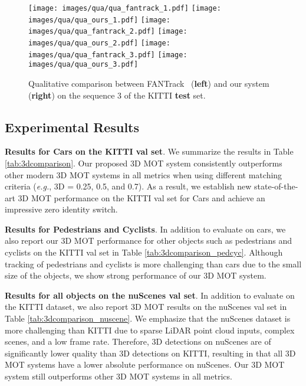 \documentclass[letterpaper, 10 pt, conference]{ieeeconf}
\begin{document}
\begin{figure*}[t]
\begin{center}
\texttt{[image: images/qua/qua\_fantrack\_1.pdf]}
\texttt{[image: images/qua/qua\_ours\_1.pdf]}
\texttt{[image: images/qua/qua\_fantrack\_2.pdf]}
\texttt{[image: images/qua/qua\_ours\_2.pdf]}
\texttt{[image: images/qua/qua\_fantrack\_3.pdf]}
\texttt{[image: images/qua/qua\_ours\_3.pdf]}
\end{center}
\vspace{-0.55cm}
\caption{Qualitative comparison between FANTrack~\cite{Baser2019} (\textbf{left}) and our system (\textbf{right}) on the sequence 3 of the KITTI \textbf{test} set.} 
\label{fig:qua}
\vspace{-0.5cm}
\end{figure*}

\subsection{Experimental Results}

\noindent\textbf{Results for Cars on the KITTI val set}. We summarize the results in Table \ref{tab:3dcomparison}. Our proposed 3D MOT system consistently outperforms other modern 3D MOT systems in all metrics when using different matching criteria (\emph{e.g.}, 3D  = 0.25, 0.5, and 0.7). As a result, we establish new state-of-the-art 3D MOT performance on the KITTI val set for Cars and achieve an impressive zero identity switch.

\vspace{1.5mm}\noindent\textbf{Results for Pedestrians and Cyclists}. In addition to evaluate on cars, we also report our 3D MOT performance for other objects such as pedestrians and cyclists on the KITTI val set in Table \ref{tab:3dcomparison_pedcyc}. Although tracking of pedestrians and cyclists is more challenging than cars due to the small size of the objects, we show strong performance of our 3D MOT system.

\vspace{1.5mm}\noindent\textbf{Results for all objects on the nuScenes val set}. In addition to evaluate on the KITTI dataset, we also report 3D MOT results on the nuScenes val set in Table \ref{tab:3dcomparison_nuscene}. We emphasize that the nuScenes dataset is more challenging than KITTI due to sparse LiDAR point cloud inputs, complex scenes, and a low frame rate. Therefore, 3D detections on nuScenes are of significantly lower quality than 3D detections on KITTI, resulting in that all 3D MOT systems have a lower absolute performance on nuScenes. Our 3D MOT system still outperforms other 3D MOT systems in all metrics.
\end{document}
